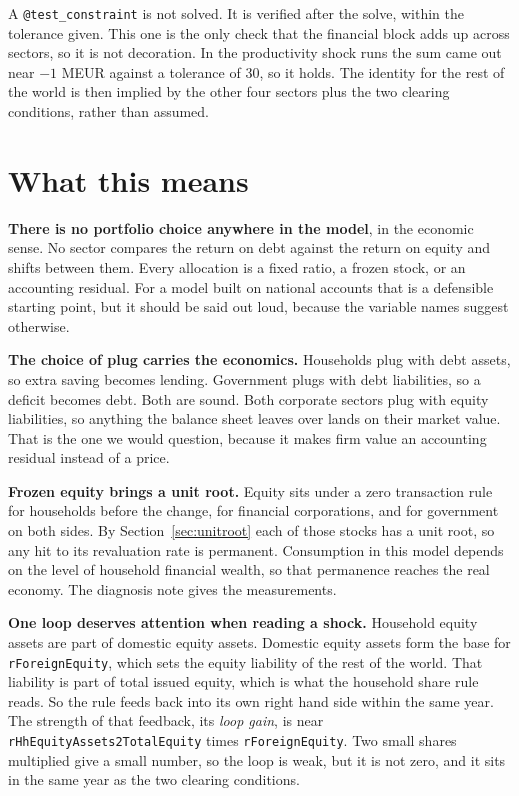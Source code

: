 \documentclass[11pt,a4paper]{article}
\begin{document}
A \texttt{@test\_constraint} is not solved. It is verified after the solve, within
the tolerance given. This one is the only check that the financial block adds up
across sectors, so it is not decoration. In the productivity shock runs the sum came
out near $-1$ MEUR against a tolerance of 30, so it holds. The identity for the
rest of the world is then implied by the other four sectors plus the two clearing
conditions, rather than assumed.

\section{What this means}

\textbf{There is no portfolio choice anywhere in the model}, in the economic sense.
No sector compares the return on debt against the return on equity and shifts
between them. Every allocation is a fixed ratio, a frozen stock, or an accounting
residual. For a model built on national accounts that is a defensible starting
point, but it should be said out loud, because the variable names suggest
otherwise.

\textbf{The choice of plug carries the economics.} Households plug with debt
assets, so extra saving becomes lending. Government plugs with debt liabilities, so
a deficit becomes debt. Both are sound. Both corporate sectors plug with equity
liabilities, so anything the balance sheet leaves over lands on their market value.
That is the one we would question, because it makes firm value an accounting
residual instead of a price.

\textbf{Frozen equity brings a unit root.} Equity sits under a zero transaction
rule for households before the change, for financial corporations, and for
government on both sides. By Section~\ref{sec:unitroot} each of those stocks has a unit root, so
any hit to its revaluation rate is permanent. Consumption in this model depends on
the level of household financial wealth, so that permanence reaches the real
economy. The diagnosis note gives the measurements.

\textbf{One loop deserves attention when reading a shock.} Household equity assets
are part of domestic equity assets. Domestic equity assets form the base for
\texttt{rForeignEquity}, which sets the equity liability of the rest of the world.
That liability is part of total issued equity, which is what the household share
rule reads. So the rule feeds back into its own right hand side within the same
year. The strength of that feedback, its \emph{loop gain}, is near
\texttt{rHhEquityAssets2TotalEquity} times \texttt{rForeignEquity}. Two small
shares multiplied give a small number, so the loop is weak, but it is not zero, and
it sits in the same year as the two clearing conditions.
\end{document}
